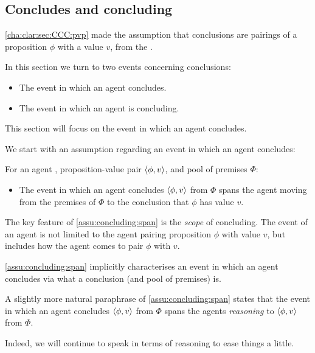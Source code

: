 \subsection{Concludes and concluding}
\label{cha:clar:sec:CCC:c-and-c}

\begin{note}
  \autoref{cha:clar:sec:CCC:pvp} made the assumption that conclusions are pairings of a proposition \(\phi\) with a value \(v\), from the \agpe{}.

  In this section we turn to two events concerning conclusions:
  \begin{itemize}
  \item
    The event in which an agent concludes.
  \item
    The event in which an agent is concluding.
  \end{itemize}
  This section will focus on the event in which an agent concludes.
\end{note}

\begin{note}
  We start with an assumption regarding an event in which an agent concludes:

  \begin{assumption}
    \label{assu:concluding:span}
    For an agent \vAgent{}, proposition-value pair \(\langle \phi, v \rangle\), and pool of premises \(\Phi\):

    \begin{itemize}
    \item
      The event in which an agent concludes \(\langle \phi, v \rangle\) from \(\Phi\) spans the agent moving from the premises of \(\Phi\) to the conclusion that \(\phi\) has value \(v\).
    \end{itemize}
    \vspace{-\baselineskip}
  \end{assumption}

  The key feature of \autoref{assu:concluding:span}  is the \emph{scope} of concluding.
  The event of an agent is not limited to the agent pairing proposition \(\phi\) with value \(v\), but includes how the agent comes to pair \(\phi\) with \(v\).

  \autoref{assu:concluding:span} implicitly characterises an event in which an agent concludes via what a conclusion (and pool of premises) is.

  A slightly more natural paraphrase of \autoref{assu:concluding:span} states that the event in which an agent concludes \(\langle \phi, v \rangle\) from \(\Phi\) spans the agents \emph{reasoning} to \(\langle \phi, v \rangle\) from \(\Phi\).

  Indeed, we will continue to speak in terms of reasoning to ease things a little.
\end{note}

